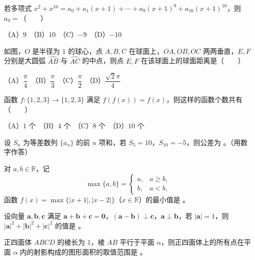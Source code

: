 \begin{question}
若多项式 $x^2+x^{10}=a_0+a_1(x+1)+\cdots+a_9(x+1)^9+a_{10}(x+1)^{10}$，则 $a_9=$\mbox{（　　）}

（A）$9$　（B）$10$　（C）$-9$　（D）$-10$

\Needspace{0.4\textheight}
\end{question}
\begin{question}
如图，$O$ 是半径为 $1$ 的球心，点 $A,B,C$ 在球面上，$OA,OB,OC$ 两两垂直，$E,F$ 分别是大圆弧 $\widehat{AB}$ 与 $\widehat{AC}$ 的中点，则点 $E,F$ 在该球面上的球面距离是\mbox{（　　）}

（A）$\dfrac{\pi}{4}$　（B）$\dfrac{\pi}{3}$　（C）$\dfrac{\pi}{2}$　（D）$\dfrac{\sqrt2\pi}{4}$
\nopagebreak[4]
\begin{center}\end{center}
\nopagebreak[4]
\end{question}
\begin{question}
函数 $f:\{1,2,3\}\to\{1,2,3\}$ 满足 $f(f(x))=f(x)$，则这样的函数个数共有\mbox{（　　）}

（A）$1$ 个　（B）$4$ 个　（C）$8$ 个　（D）$10$ 个

\end{question}

\begin{question}
设 $S_n$ 为等差数列 $\{a_n\}$ 的前 $n$ 项和，若 $S_5=10$，$S_{10}=-5$，则公差为 \gkblank{}。（用数字作答）

\end{question}
\begin{question}
对 $a,b\in\mathbb R$，记
\nopagebreak[4]
\[
\max\{a,b\}=\begin{cases}
a,&a\geqslant b,\\
b,&a<b,
\end{cases}
\]
函数 $f(x)=\max\{|x+1|,|x-2|\}$（$x\in\mathbb R$）的最小值是 \gkblank{}。

\end{question}
\begin{question}
设向量 $\boldsymbol a,\boldsymbol b,\boldsymbol c$ 满足 $\boldsymbol a+\boldsymbol b+\boldsymbol c=\boldsymbol0$，$(\boldsymbol a-\boldsymbol b)\perp\boldsymbol c$，$\boldsymbol a\perp\boldsymbol b$，若 $|\boldsymbol a|=1$，则 $|\boldsymbol a|^2+|\boldsymbol b|^2+|\boldsymbol c|^2$ 的值是 \gkblank{}。

\Needspace{0.4\textheight}
\end{question}
\begin{question}
正四面体 $ABCD$ 的棱长为 $1$，棱 $AB$ 平行于平面 $\alpha$，则正四面体上的所有点在平面 $\alpha$ 内的射影构成的图形面积的取值范围是 \gkblank{}。
\nopagebreak[4]
\begin{center}\end{center}
\nopagebreak[4]
\end{question}

